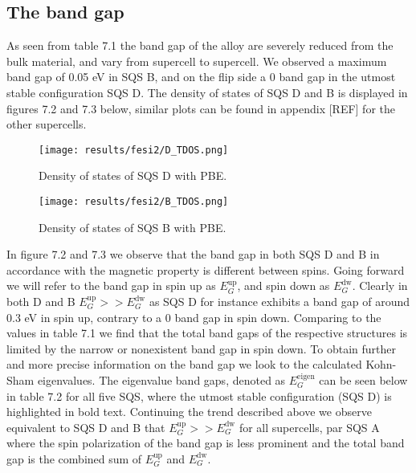 \newpage
\subsection{The band gap}
As seen from table 7.1 the band gap of the alloy are severely reduced from the bulk material, and vary from supercell to supercell. We observed a maximum band gap of 0.05 eV in SQS B, and on the flip side a 0 band gap in the utmost stable configuration SQS D. The density of states of SQS D and B is displayed in figures 7.2 and 7.3 below, similar plots can be found in appendix [REF] for the other supercells. 

\begin{figure}[H]
	\centering
	\texttt{[image: results/fesi2/D\_TDOS.png]}
	\caption{Density of states of SQS D  with PBE.}
\end{figure}

\begin{figure}[H]
\centering
	\texttt{[image: results/fesi2/B\_TDOS.png]}
	\caption{Density of states of SQS B  with PBE.}
\end{figure}  

In figure 7.2  and 7.3 we observe that the band gap in both SQS D and B in accordance with the magnetic property is different between spins. Going forward we will refer to the band gap in spin up as $E_G ^\text{up}$, and spin down as $E_G ^\text{dw}$. Clearly in both D and B $E_G ^\text{up} >> E_G ^\text{dw}$ as SQS D for instance exhibits a band gap of around 0.3 eV in spin up, contrary to a 0 band gap in spin down. Comparing to the values in table 7.1 we find that the total band gaps of the respective structures is limited by the narrow or nonexistent band gap in spin down. To obtain further and more precise information on the band gap we look to the calculated Kohn-Sham eigenvalues. The eigenvalue band gaps, denoted as $E_G ^\text{eigen}$ can be seen below in table 7.2 for all five SQS, where the utmost stable configuration (SQS D) is highlighted in bold text. Continuing the trend described above we observe equivalent to SQS D and B that $E_G ^\text{up} >> E_G ^\text{dw}$ for all supercells, par SQS A where the spin polarization of the band gap is less prominent and the total band gap is the combined sum of $E_G ^\text{up}$ and $E_G ^\text{dw}$.

